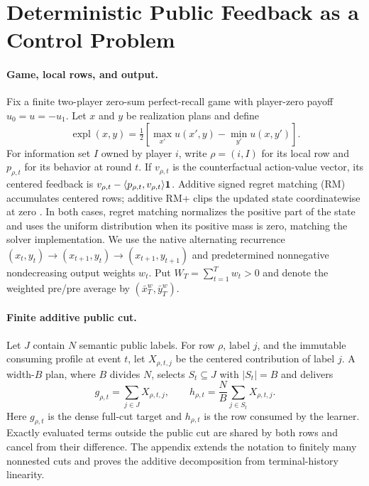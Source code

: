 \section{Deterministic Public Feedback as a Control Problem}
\label{sec:background}

\paragraph{Game, local rows, and output.}
Fix a finite two-player zero-sum perfect-recall game with player-zero payoff
$u_0=u=-u_1$.  Let $x$ and $y$ be realization plans and define
\begin{equation}
\operatorname{expl}(x,y)=\tfrac12\left[
\max_{x'}u(x',y)-\min_{y'}u(x,y')\right].
\label{eq:gap-definition}
\end{equation}
For information set $I$ owned by player $i$, write $\rho=(i,I)$ for its local
row and $p_{\rho,t}$ for its behavior at round $t$.  If
$v_{\rho,t}$ is the counterfactual action-value vector, its centered feedback
is $v_{\rho,t}-\langle p_{\rho,t},v_{\rho,t}\rangle\mathbf 1$.  Additive signed
regret matching (RM) accumulates centered rows; additive RM+ clips the updated
state coordinatewise at zero \citep{tammelin2014cfrplus}.  In both cases,
regret matching normalizes the positive part of the state and uses the
uniform distribution when its positive mass is zero, matching the solver
implementation.  We use the native
alternating recurrence
$(x_t,y_t)\to(x_{t+1},y_t)\to(x_{t+1},y_{t+1})$ and predetermined
nonnegative nondecreasing output weights $w_t$.  Put
$W_T=\sum_{t=1}^T w_t>0$ and denote the weighted pre/pre average by
$(\bar x_T^w,\bar y_T^w)$.

\paragraph{Finite additive public cut.}
Let $J$ contain $N$ semantic public labels.  For row $\rho$, label $j$, and
the immutable consuming profile at event $t$, let
$X_{\rho,t,j}$ be the centered contribution of label $j$.  A width-$B$ plan,
where $B$ divides $N$, selects $S_t\subseteq J$ with $|S_t|=B$ and delivers
\begin{equation}
g_{\rho,t}=\sum_{j\in J}X_{\rho,t,j},\qquad
h_{\rho,t}=\frac{N}{B}\sum_{j\in S_t}X_{\rho,t,j}.
\label{eq:public-rows}
\end{equation}
Here $g_{\rho,t}$ is the dense full-cut target and $h_{\rho,t}$ is the row
consumed by the learner.  Exactly evaluated terms outside the public cut are
shared by both rows and cancel from their difference.  The appendix extends
the notation to finitely many nonnested cuts and proves the additive
decomposition from terminal-history linearity.

